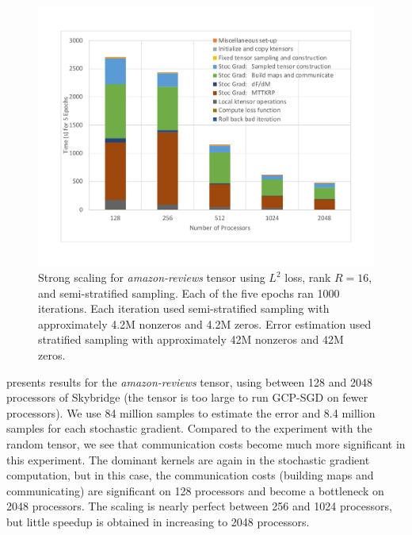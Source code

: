 \begin{figure}
\centering
\includegraphics[keepaspectratio=true, width=4.5in]{figs/amazon_stacked}
\caption[Strong scaling of GCP-SGD for \emph{amazon-reviews} tensor]{Strong scaling for \emph{amazon-reviews} tensor using $L^2$ loss, rank $R=16$, and semi-stratified sampling.  
Each of the five epochs ran 1000 iterations.  
Each iteration used semi-stratified sampling with approximately 4.2M nonzeros and 4.2M zeros. 
Error estimation used stratified sampling with approximately 42M nonzeros and 42M zeros. 
}
\label{fig:amazon_scaling}
\end{figure}

 presents results for the \emph{amazon-reviews} tensor, using between 128 and 2048 processors of Skybridge (the tensor is too large to run GCP-SGD on fewer processors).
We use 84 million samples to estimate the error and 8.4 million samples for each stochastic gradient.
Compared to the experiment with the random tensor, we see that communication costs become much more significant in this experiment.
The dominant kernels are again in the stochastic gradient computation, but in this case, the communication costs (building maps and communicating) are significant on 128 processors and become a bottleneck on 2048 processors.
The scaling is nearly perfect between 256 and 1024 processors, but little speedup is obtained in increasing to 2048 processors.
